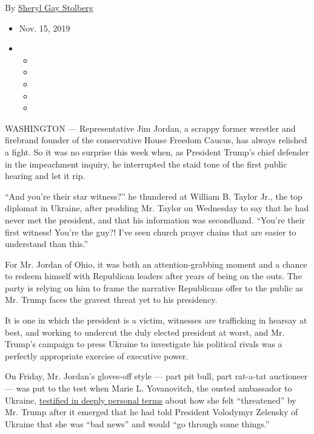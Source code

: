 By
\href{https://www.nytimes3xbfgragh.onion/by/sheryl-gay-stolberg}{Sheryl
Gay Stolberg}

\begin{itemize}
\item
  Nov. 15, 2019
\item
  \begin{itemize}
  \item
  \item
  \item
  \item
  \item
  \end{itemize}
\end{itemize}

WASHINGTON --- Representative Jim Jordan, a scrappy former wrestler and
firebrand founder of the conservative House Freedom Caucus, has always
relished a fight. So it was no surprise this week when, as President
Trump's chief defender in the impeachment inquiry, he interrupted the
staid tone of the first public hearing and let it rip.

``And you're their star witness?'' he thundered at William B. Taylor
Jr., the top diplomat in Ukraine, after prodding Mr. Taylor on Wednesday
to say that he had never met the president, and that his information was
secondhand. ``You're their first witness! You're the guy?! I've seen
church prayer chains that are easier to understand than this.''

For Mr. Jordan of Ohio, it was both an attention-grabbing moment and a
chance to redeem himself with Republican leaders after years of being on
the outs. The party is relying on him to frame the narrative Republicans
offer to the public as Mr. Trump faces the gravest threat yet to his
presidency.

It is one in which the president is a victim, witnesses are trafficking
in hearsay at best, and working to undercut the duly elected president
at worst, and Mr. Trump's campaign to press Ukraine to investigate his
political rivals was a perfectly appropriate exercise of executive
power.

On Friday, Mr. Jordan's gloves-off style --- part pit bull, part
rat-a-tat auctioneer --- was put to the test when Marie L. Yovanovitch,
the ousted ambassador to Ukraine,
\href{https://www.nytimes3xbfgragh.onion/2019/11/15/us/politics/trump-yovanovitch.html?action=click\&module=Top\%20Stories\&pgtype=Homepage}{testified
in deeply personal terms} about how she felt ``threatened'' by Mr. Trump
after it emerged that he had told President Volodymyr Zelensky of
Ukraine that she was ``bad news'' and would ``go through some things.''

